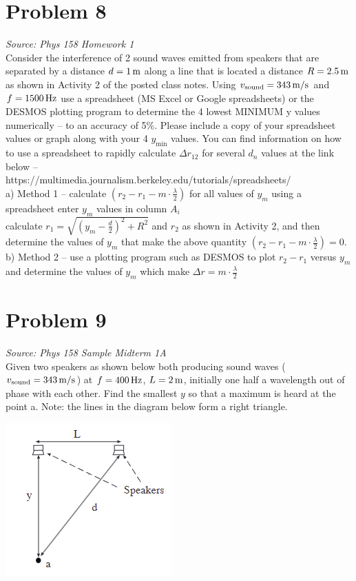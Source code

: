 \documentclass[11pt, fleqn]{article}
\begin{document}
\section*{Problem 8}
\textit{Source: Phys 158 Homework 1}\\
Consider the interference of 2 sound waves emitted from speakers that are separated by a distance $d =
1\,\mathrm{m}$ along a line that is located a distance $R = 2.5\,\mathrm{m}$ as shown in Activity 2 of the posted class notes. Using
$v_\text{sound} = 343 \,\mathrm{m/s}$ and $f = 1500 \,\mathrm{Hz}$ use a spreadsheet (MS Excel or Google spreadsheets) or the DESMOS
plotting program to determine the 4 lowest MINIMUM y values numerically -- to an accuracy of 5\%. Please
include a copy of your spreadsheet values or graph along with your 4 $y_\text{min}$ values. You can find information
on how to use a spreadsheet to rapidly calculate $\Delta r_{12}$ for several $d_n$ values at the link below --\\
https://multimedia.journalism.berkeley.edu/tutorials/spreadsheets/\\
a) Method 1 -- calculate $(r_2-r_1-m\cdot\frac{\lambda}{2})$ for all values of $y_m$ using a spreadsheet
enter $y_m$ values in column $A_i$\\
calculate $r_1 = \sqrt{(y_m-\frac{d}{2})^2+R^2}$ and $r_2$ as shown in Activity 2, and then
determine the values of $y_m$ that make the above quantity $(r_2-r_1-m\cdot\frac{\lambda}{2})=0$.\\
b) Method 2 -- use a plotting program such as DESMOS to plot $r_2-r_1$ versus $y_m$ and determine the values of $y_m$ which make $\Delta r=m\cdot\frac{\lambda}{2}$

\section*{Problem 9}
\textit{Source: Phys 158 Sample Midterm 1A}\\
Given two speakers as shown below both producing sound waves ($v_\text{sound} =
343\,\mathrm{m/s}$) at $f = 400\,\mathrm{Hz}$, $L = 2\,\mathrm{m}$, initially one half a wavelength out of phase with each
other. Find the smallest $y$ so that a maximum is heard at the point a. Note: the lines in
the diagram below form a right triangle.\\
\centerline{\includegraphics{Images/RightAngleInterference2.png}}
\end{document}
